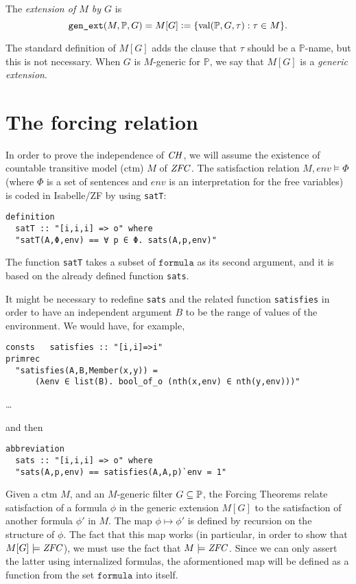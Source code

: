 \documentclass[11pt,english]{article}
\renewcommand{\PP}{\mathbb{P}}
\newcommand{\formula}{\ensuremath{\mathtt{formula}}}
\DeclareMathOperator{\val}{val}
\begin{document}
\begin{definition}
  The \emph{extension of $M$ by $G$} is
  \[
  \verb|gen_ext|(M,\PP,G) = M[G] \defi \{\val(\PP,G,\tau): \tau\in M\}.
  \]
\end{definition}
The standard definition of $M[G]$ adds the clause that $\tau$ should be
a $\PP$-name, but this is not necessary. When $G$ is $M$-generic for
$\PP$, we say that $M[G]$ is a \emph{generic extension}.

\section{The forcing relation}
In order to prove the independence of $\mathit{CH}$, we will assume the
existence of countable transitive model (ctm) $M$ of $\mathit{ZFC}$. The
satisfaction relation $M,\mathit{env}\models\Phi$ (where $\Phi$ is a set of
sentences and $\mathit{env}$ is an interpretation for the free
variables) is coded in Isabelle/ZF by using \verb|satT|:
\begin{verbatim}
definition
  satT :: "[i,i,i] => o" where
  "satT(A,Φ,env) == ∀ p ∈ Φ. sats(A,p,env)"
\end{verbatim}
The function \verb|satT| takes a subset of \formula{} as its second
argument, and it is based on the already defined function \verb|sats|.

\begin{framed}
  It might be necessary to redefine \verb|sats| and the related
  function \verb|satisfies| in order to have an independent argument $B$
  to be the range of values of the environment. We would have, for
  example, 
\begin{verbatim}
consts   satisfies :: "[i,i]=>i"
primrec 
  "satisfies(A,B,Member(x,y)) =
      (λenv ∈ list(B). bool_of_o (nth(x,env) ∈ nth(y,env)))"
\end{verbatim}
  \dots
  
\noindent and then
\begin{verbatim}
abbreviation
  sats :: "[i,i,i] => o" where
  "sats(A,p,env) == satisfies(A,A,p)`env = 1"
\end{verbatim}
\end{framed}

Given a ctm $M$, and an $M$-generic filter $G\sbq\PP$, the Forcing
Theorems relate satisfaction of a formula 
$\phi$ in the generic extension $M[G]$ to the satisfaction of another formula
$\phi'$ in $M$. The map $\phi\mapsto\phi'$ is defined by recursion on
the structure of $\phi$. The fact that this map works (in particular,
in order to show that $M[G]\models\mathit{ZFC}$), we must use the fact that
$M\models\mathit{ZFC}$. Since we can only assert the latter using internalized
formulas, the aformentioned map will be defined as a function from the
set \formula{} into itself. 
\end{document}
